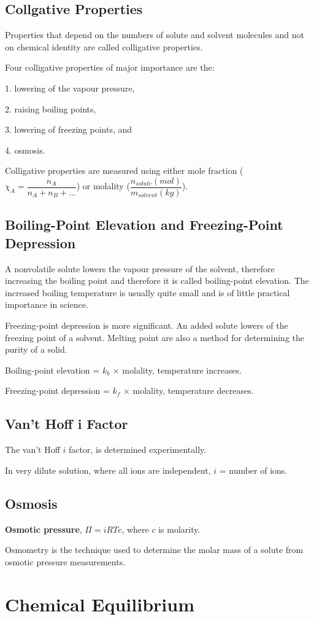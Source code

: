 \documentclass[a4paper,12pt]{article}
\begin{document}
\subsection{Collgative Properties}
Properties that depend on the numbers of solute and solvent molecules and not on chemical identity are called colligative properties.\par
Four colligative properties of major importance are the:\par
1. lowering of the vapour pressure,\par
2. raising boiling points,\par
3. lowering of freezing points, and\par
4. osmosis.\par
Colligative properties are measured using either mole fraction ($\chi_{A}=\dfrac{n_{A}}{n_{A}+n_{B}+...}$) or molality ($\dfrac{n_{solute}(mol)}{m_{solvent}(kg)}$).
\subsection{Boiling-Point Elevation and Freezing-Point Depression}
A nonvolatile solute lowers the vapour pressure of the solvent, therefore increasing the boiling point and therefore it is called boiling-point elevation. The increased boiling temperature is usually quite small and is of little practical importance in science.\par
Freezing-point depression is more significant. An added solute lowers of the freezing point of a solvent. Melting point are also a method for determining the purity of a solid.\par
Boiling-point elevation = $k_{b}$ × molality, temperature increases.\par
Freezing-point depression = $k_{f}$ × molality, temperature decreases.
\subsection{Van't Hoff i Factor}
The van't Hoff $i$ factor, is determined experimentally.\par
In very dilute solution, where all ions are independent, $i$ = number of ions.
\subsection{Osmosis}
\textbf{Osmotic pressure}, $\Pi = iRTc$, where $c$ is molarity.\par
Osmometry is the technique used to determine the molar mass of a solute from osmotic pressure measurements.


\newpage
\section{Chemical Equilibrium}

\newpage
\end{document}
